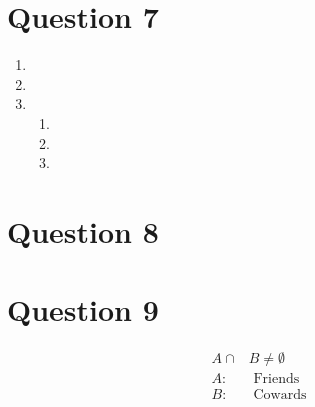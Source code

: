 \documentclass[a4paper, fleqn]{article}
\begin{document}
\section{Question 7}

\begin{enumerate}[label=(\alph{*})]
\item 
\item 
\item 
\begin{enumerate}[label=(\roman{*})]
\item 
\item 
\item 
\end{enumerate}
\end{enumerate}

\section{Question 8}

\section{Question 9}

$$
\begin{aligned}
A\cap&B\neq\emptyset\\
A:&\text{  Friends}\\
B:&\text{  Cowards}
\end{aligned}
$$
\end{document}
